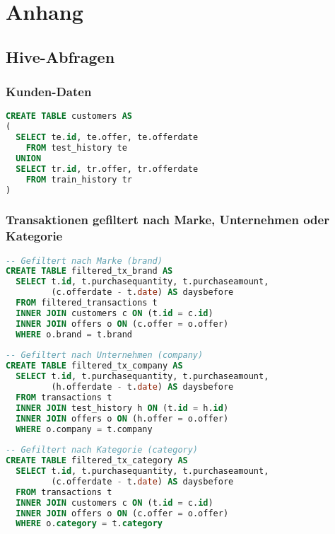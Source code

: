\section{Anhang}
\subsection{Hive-Abfragen}

\subsubsection{Kunden-Daten}
\begin{lstlisting}[language=SQL]
CREATE TABLE customers AS 
(
  SELECT te.id, te.offer, te.offerdate
    FROM test_history te
  UNION
  SELECT tr.id, tr.offer, tr.offerdate
    FROM train_history tr 
)
\end{lstlisting}

\subsubsection{Transaktionen gefiltert nach Marke, Unternehmen oder Kategorie}
\label{sql:filtered_tx}
\begin{lstlisting}[language=SQL]
-- Gefiltert nach Marke (brand)
CREATE TABLE filtered_tx_brand AS
  SELECT t.id, t.purchasequantity, t.purchaseamount, 
         (c.offerdate - t.date) AS daysbefore 
  FROM filtered_transactions t 
  INNER JOIN customers c ON (t.id = c.id)
  INNER JOIN offers o ON (c.offer = o.offer)
  WHERE o.brand = t.brand
  
-- Gefiltert nach Unternehmen (company)
CREATE TABLE filtered_tx_company AS
  SELECT t.id, t.purchasequantity, t.purchaseamount, 
         (h.offerdate - t.date) AS daysbefore 
  FROM transactions t 
  INNER JOIN test_history h ON (t.id = h.id)
  INNER JOIN offers o ON (h.offer = o.offer)
  WHERE o.company = t.company
  
-- Gefiltert nach Kategorie (category)
CREATE TABLE filtered_tx_category AS
  SELECT t.id, t.purchasequantity, t.purchaseamount, 
         (c.offerdate - t.date) AS daysbefore 
  FROM transactions t 
  INNER JOIN customers c ON (t.id = c.id)
  INNER JOIN offers o ON (c.offer = o.offer)
  WHERE o.category = t.category
\end{lstlisting}

